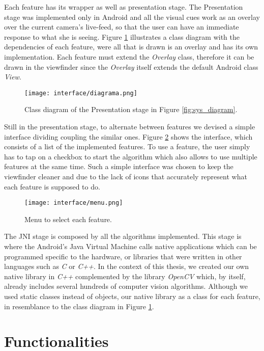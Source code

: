 Each feature has its wrapper as well as presentation stage. The Presentation stage was implemented only in Android and all the visual cues work as an overlay over the current camera's live-feed, so that the user can have an immediate response to what she is seeing. Figure \ref{fig:class_diagram} illustrates a class diagram with the dependencies of each feature, were all that is drawn is an overlay and has its own implementation. Each feature must extend the \emph{Overlay} class, therefore it can be drawn in the viewfinder since the \emph{Overlay} itself extends the default Android class \emph{View}.

\begin{figure}[htb]
	\centering
	\texttt{[image: interface/diagrama.png]}
	\caption{Class diagram of the Presentation stage in Figure \ref{fig:sys_diagram}.}
	\label{fig:class_diagram}
\end{figure}

Still in the presentation stage, to alternate between features we devised a simple interface dividing coupling the similar ones. Figure \ref{fig:app_menu} shows the interface, which consists of a list of the implemented features. To use a feature, the user simply has to tap on a checkbox to start the algorithm which also allows to use multiple features at the same time. Such a simple interface was chosen to keep the viewfinder cleaner and due to the lack of icons that accurately represent what each feature is supposed to do.
\begin{figure}[htb]
	\centering
	\texttt{[image: interface/menu.png]}
	\caption{Menu to select each feature.}
	\label{fig:app_menu}
\end{figure}


The JNI stage is composed by all the algorithms implemented. This stage is where the Android's Java Virtual Machine calls native applications which can be programmed specific to the hardware, or libraries that were written in other languages such as \emph{C} or \emph{C++}. In the context of this thesis, we created our own native library in \emph{C++} complemented by the library \emph{OpenCV} which, by itself, already includes several hundreds of computer vision algorithms. Although we used static classes instead of objects, our native library as a class for each feature, in resemblance to the class diagram in Figure \ref{fig:class_diagram}.

\section{Functionalities}
\label{sec:functionalities}


